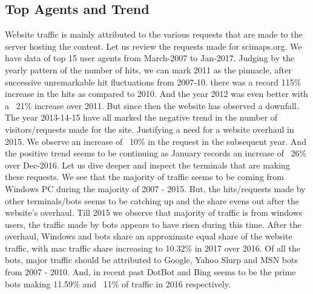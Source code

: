 \subsection{Top Agents and Trend} \label{viztopagents}
Website traffic is mainly attributed to the  various requests that are made to the server hosting the content. Let us review the requests made for scimaps.org. 
We have data of top 15 user agents from March-2007 to Jan-2017.  
Judging by the yearly pattern of the number of hits, we can mark 2011 as the pinnacle, after successive unremarkable hit fluctuations from 2007-10. there was a record 115$\%$ increase in the hits as compared to 2010. And the year 2012 was even better with a ~21$\%$ increase over 2011. But since then the website has observed a downfall. The year 2013-14-15 have all marked the negative trend in the number of visitors/requests made for the site. Justifying a need for a website overhaul in 2015. We observe an increase of ~10$\%$ in the request in the subsequent year. And the positive trend seems to be continuing as January records an increase of ~26$\%$  over Dec-2016.
Let us dive deeper and inspect the terminals that are making these requests. We see that the majority of traffic seems to be coming from Windows PC during the majority of 2007 - 2015. But, the hits/requests made by other terminals/bots seems to be catching up and the share evens out after the website’s overhaul. Till 2015 we observe that majority of traffic is from windows users, the traffic made by bots appears to have risen during this time. After the overhaul, Windows and bots share an approximate equal share of the website traffic, with mac traffic share increasing to 10.32$\%$ in 2017 over 2016. 
Of all the bots, major traffic should be attributed to Google, Yahoo Slurp and MSN bots from 2007 - 2010. And, in recent past DotBot and Bing seems to be the prime bots making 11.59$\%$ and ~11$\%$ of traffic in 2016 respectively.
